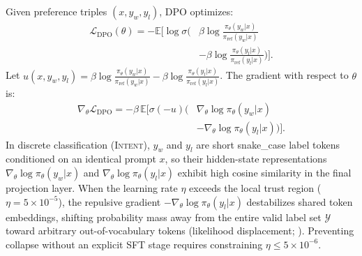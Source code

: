 \documentclass[10pt,a4paper,twocolumn]{article}
\begin{document}
Given preference triples $(x, y_w, y_l)$, DPO \citep{rafailov2023direct} optimizes:
\begin{equation}
\begin{aligned}
  \mathcal{L}_{\text{DPO}}(\theta) = -\mathbb{E}\bigg[\log \sigma\Big(&\beta \log \frac{\pi_\theta(y_w|x)}{\pi_{\text{ref}}(y_w|x)} \\
  &- \beta \log \frac{\pi_\theta(y_l|x)}{\pi_{\text{ref}}(y_l|x)}\Big)\bigg].
\end{aligned}
\label{eq:dpo_loss}
\end{equation}
Let $u(x, y_w, y_l) = \beta \log \frac{\pi_\theta(y_w|x)}{\pi_{\text{ref}}(y_w|x)} - \beta \log \frac{\pi_\theta(y_l|x)}{\pi_{\text{ref}}(y_l|x)}$. The gradient with respect to $\theta$ is:
\begin{equation}
\begin{aligned}
  \nabla_\theta \mathcal{L}_{\text{DPO}} = -\beta\,\mathbb{E}\Big[\sigma(-u)\big(&\nabla_\theta \log \pi_\theta(y_w|x) \\
  &- \nabla_\theta \log \pi_\theta(y_l|x)\big)\Big].
\end{aligned}
\label{eq:dpo_grad}
\end{equation}
In discrete classification (\textsc{Intent}), $y_w$ and $y_l$ are short snake\_case label tokens conditioned on an identical prompt $x$, so their hidden-state representations $\nabla_\theta \log \pi_\theta(y_w|x)$ and $\nabla_\theta \log \pi_\theta(y_l|x)$ exhibit high cosine similarity in the final projection layer. When the learning rate $\eta$ exceeds the local trust region ($\eta = 5\times 10^{-5}$), the repulsive gradient $-\nabla_\theta \log \pi_\theta(y_l|x)$ destabilizes shared token embeddings, shifting probability mass away from the entire valid label set $\mathcal{Y}$ toward arbitrary out-of-vocabulary tokens (likelihood displacement; \citealp{pal2024smaug,tajwar2024preference}). Preventing collapse without an explicit SFT stage requires constraining $\eta \le 5\times 10^{-6}$.

\begin{table}[t]
\centering
{}
\caption{\textbf{Diagnostic benchmark statistics.} Cross-split ID overlap is strictly $\emptyset$ across all tasks; \textsc{Intent} test queries use held-out syntactic templates disjoint from train and dev.}
\label{tab:dataset}
\end{table}
\end{document}
